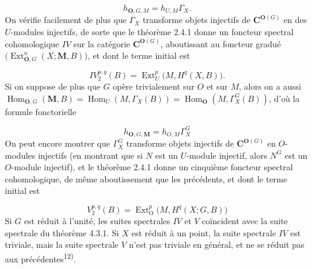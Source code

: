 \begin{equation}
h_{{\mathbf O},G,M}=h_{U,M}\Gamma_X.
\tag{5.6.5 bis}
\end{equation}
On vérifie facilement de plus que $\Gamma_X$ transforme objets injectifs de
${\mathbf C}^{{\mathbf O}(G)}$ en des $U$-modules injectifs, de sorte que le théorème 2.4.1 donne
un foncteur spectral cohomologique $IV$ sur la catégorie ${\mathbf C}^{{\mathbf O}(G)}$,
aboutissant au foncteur gradué
$\bigl(\operatorname{Ext}_{{\mathbf O},G}^n(X;{\mathbf M},B)\bigr)$, et dont le terme initial est

\begin{equation}
IV_2^{p,q}(B)=\operatorname{Ext}_U^p\bigl(M,H^q(X,B)\bigr).
\tag{5.6.11 bis}
\end{equation}
Si on suppose de plus que $G$ opère trivialement sur $O$ et sur $M$, alors
on a aussi
$\operatorname{Hom}_{{\mathbf O},G}({\mathbf M},B)=\operatorname{Hom}_U(M,\Gamma_X(B))=\operatorname{Hom}_{{\mathbf O}}(M,\Gamma_X^G(B))$,
d'où la formule fonctorielle

\begin{equation}
h_{{\mathbf O},G,{\mathbf M}}=h_{O,M}\Gamma_X^G
\tag{5.6.5 ter}
\end{equation}
On peut encore montrer que $\Gamma_X^G$ transforme objets injectifs de
${\mathbf C}^{{\mathbf O}(G)}$ en $O$-modules injectifs (en montrant que si $N$ est un $U$-module
injectif, alors $N^G$ est un $O$-module injectif), et le théorème 2.4.1 donne
un cinquième foncteur spectral cohomologique, de même aboutissement que les
précédents, et dont le terme initial est

\begin{equation}
V_2^{p,q}(B)=\operatorname{Ext}_{\mathrm O}^p\bigl(M,H^q(X;G,B)\bigr)
\tag{5.6.11 ter}
\end{equation}
Si $G$ est réduit à l'unité, les suites spectrales $IV$ et $V$ coïncident avec la
suite spectrale du théorème 4.3.1. Si $X$ est réduit à un point, la suite
spectrale $IV$ est triviale, mais la suite spectrale $V$ n'est pas triviale en
général, et ne se réduit pas aux précédentes\textsuperscript{12)}.

